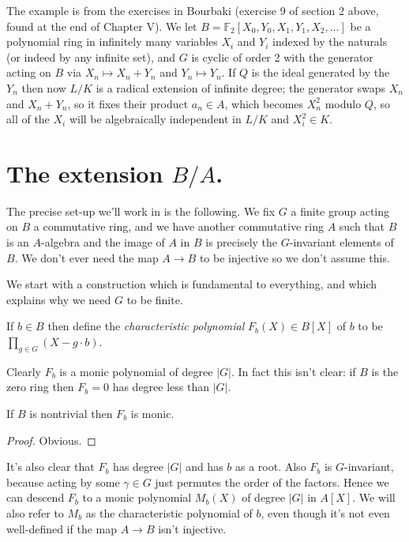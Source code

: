 The example is from the exercises in Bourbaki (exercise 9 of section 2 above, found at the end
of Chapter V). We let $B=\mathbb{F}_2[X_0,Y_0,X_1,Y_1,X_2,\ldots]$
be a polynomial ring in infinitely many variables $X_i$ and $Y_i$ indexed by the
naturals (or indeed by any infinite set), and $G$ is cyclic of order 2 with
the generator acting on $B$ via $X_n\mapsto X_n+Y_n$ and $Y_n\mapsto Y_n$.
If $Q$ is the ideal generated by the $Y_n$ then now $L/K$ is a radical extension of
infinite degree; the generator swaps $X_n$ and $X_n+Y_n$, so it fixes
their product $a_n\in A$, which becomes $X_n^2$ modulo $Q$, so all
of the $X_{i}$ will be algebraically independent in $L/K$ and $X_{i}^2\in K$.

\section{The extension \texorpdfstring{$B/A$}{B/A}.}

The precise set-up we'll work in is the following. We fix $G$ a finite group acting
on $B$ a commutative ring, and we have another commutative ring $A$ such
that $B$ is an $A$-algebra and the image of $A$ in $B$ is precisely the $G$-invariant
elements of $B$. We don't ever need the map $A\to B$ to be injective so we don't assume this.

We start with a construction which is fundamental to everything,
and which explains why we need $G$ to be finite.

\begin{definition}
  \label{MulSemiringAction.charpoly}
  \mathlibok
  If $b\in B$ then define the \emph{characteristic polynomial}
  $F_b(X) \in B[X]$ of $b$ to be $\prod_{g\in G}(X-g\cdot b)$.
\end{definition}

Clearly $F_b$ is a monic polynomial of degree $|G|$. In fact this isn't clear:
if $B$ is the zero ring then $F_b=0$ has degree less than $|G|$.

\begin{lemma}
  \label{MulSemiringAction.monic_charpoly}
  \mathlibok
  If $B$ is nontrivial then $F_b$ is monic.
\end{lemma}
\begin{proof}
  \mathlibok
  Obvious.
\end{proof}

It's also clear that $F_b$ has degree $|G|$ and has $b$ as a root.
Also $F_b$ is $G$-invariant, because acting by some $\gamma\in G$
just permutes the order of the factors. Hence we can descend $F_b$
to a monic polynomial $M_b(X)$ of degree $|G|$ in $A[X]$. We will
also refer to $M_b$ as the characteristic polynomial of $b$, even though
it's not even well-defined if the map $A\to B$ isn't injective.

